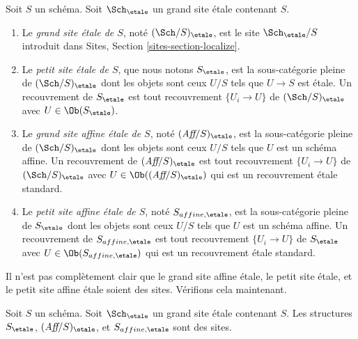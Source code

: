 \begin{definition}
\label{definition-big-small-etale}
Soit $S$ un schéma. Soit $\Sch_\etale$ un grand site étale contenant $S$.
\begin{enumerate}
\item Le {\it grand site étale de $S$}, noté $(\Sch/S)_\etale$, est le site $\Sch_\etale/S$ introduit dans Sites, Section \ref{sites-section-localize}.
\item Le {\it petit site étale de $S$}, que nous notons $S_\etale$, est la sous-catégorie pleine de $(\Sch/S)_\etale$ dont les objets sont ceux $U/S$ tels que $U \to S$ est étale. Un recouvrement de $S_\etale$ est tout recouvrement $\{U_i \to U\}$ de $(\Sch/S)_\etale$ avec $U \in \Ob(S_\etale)$.
\item Le {\it grand site affine étale de $S$}, noté $(\textit{Aff}/S)_\etale$, est la sous-catégorie pleine de $(\Sch/S)_\etale$ dont les objets sont ceux $U/S$ tels que $U$ est un schéma affine. Un recouvrement de $(\textit{Aff}/S)_\etale$ est tout recouvrement $\{U_i \to U\}$ de $(\Sch/S)_\etale$ avec $U \in \Ob((\textit{Aff}/S)_\etale)$ qui est un recouvrement étale standard.
\item Le {\it petit site affine étale de $S$}, noté $S_{affine, \etale}$, est la sous-catégorie pleine de $S_\etale$ dont les objets sont ceux $U/S$ tels que $U$ est un schéma affine. Un recouvrement de $S_{affine, \etale}$ est tout recouvrement $\{U_i \to U\}$ de $S_\etale$ avec $U \in \Ob(S_{affine, \etale})$ qui est un recouvrement étale standard.
\end{enumerate}
\end{definition}


\noindent
Il n'est pas complètement clair que le grand site affine étale, le petit site étale, et le petit site affine étale soient des sites. Vérifions cela maintenant.

\begin{lemma}
\label{lemma-verify-site-etale}
Soit $S$ un schéma. Soit $\Sch_\etale$ un grand site étale contenant $S$. Les structures $S_\etale$, $(\textit{Aff}/S)_\etale$, et $S_{affine, \etale}$ sont des sites.
\end{lemma}

